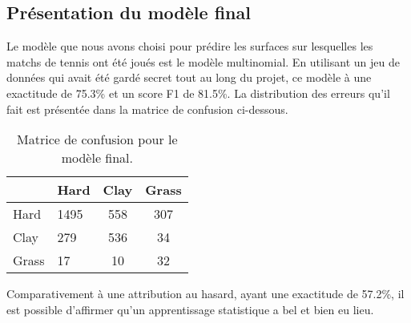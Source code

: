 \subsection{Présentation du modèle final}

Le modèle que nous avons choisi pour prédire les surfaces sur lesquelles les matchs de tennis ont été joués est le modèle multinomial. En utilisant un jeu de données qui avait été gardé secret tout au long du projet, ce modèle à une exactitude de 75.3\% et un score F1 de 81.5\%. La distribution des erreurs qu'il fait est présentée dans la matrice de confusion ci-dessous.

\begin{table}[H]
	
	\caption{\label{tab:matrice_confusion}Matrice de confusion pour le modèle final.}
	\centering
	\begin{tabular}[t]{llcc}
		\hiderowcolors
		\toprule
		& Hard & Clay & Grass\\
		\midrule
		\showrowcolors
		Hard & 1495 & 558 & 307\\
		Clay & 279 & 536 & 34\\
		Grass & 17 & 10 & 32\\
		\bottomrule
	\end{tabular}
\end{table}

Comparativement à une attribution au hasard, ayant une exactitude de 57.2\%, il est possible d'affirmer qu'un apprentissage statistique a bel et bien eu lieu. 